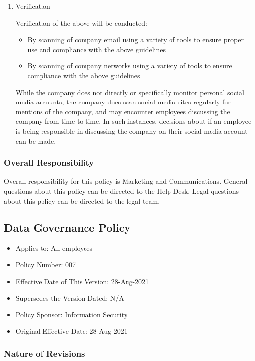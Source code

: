 \documentclass[stu]{apa7}
\begin{document}
\begin{enumerate}
\item Verification
\label{sec:org30960ce}

Verification of the above will be conducted:

\begin{itemize}
\item By scanning of company email using a variety of tools to ensure proper use and compliance with the above guidelines
\item By scanning of company networks using a variety of tools to ensure compliance with the above guidelines
\end{itemize}

While the company does not directly or specifically monitor personal social media accounts, the company does scan social media sites regularly for mentions of the company, and may encounter employees discussing the company from time to time. In such instances, decisions about if an employee is being responsible in discussing the company on their social media account can be made.
\end{enumerate}

\subsubsection{Overall Responsibility}
\label{sec:orgb548905}

Overall responsibility for this policy is Marketing and Communications. General questions about this policy can be directed to the Help Desk. Legal questions about this policy can be directed to the legal team.

\subsection{Data Governance Policy}
\label{sec:org2d8d30a}

\begin{itemize}
\item Applies to: All employees
\item Policy Number: 007
\item Effective Date of This Version: 28-Aug-2021
\item Supersedes the Version Dated: N/A
\item Policy Sponsor: Information Security
\item Original Effective Date: 28-Aug-2021
\end{itemize}

\subsubsection{Nature of Revisions}
\label{sec:orge6f8c75}
\end{document}
